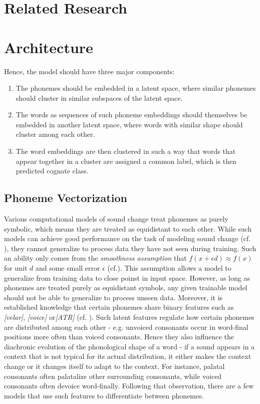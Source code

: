 \documentclass[6pt]{article}
\begin{document}
\section{Related Research}
\section{Architecture}
Hence, the model should have three major components:
\begin{enumerate}
\item The phonemes should be embedded in a latent space, where similar phonemes should cluster in similar subspaces of the latent space.
\item The words as sequences of such phoneme embeddings should themselves be embedded in another latent space, where words with similar shape should cluster among each other. 
\item The word embeddings are then clustered in such a way that words that appear together in a cluster are assigned a common label, which is then predicted cognate class.
\end{enumerate}

\subsection{Phoneme Vectorization}
\label{Phoneme Vectorization}
Various computational models of sound change treat phonemes as purely symbolic, which means they are treated as equidistant to each other. While such models can achieve good performance on the task of modeling sound change (cf. \cite{bouchard2007probabilistic,bouchard2013automated}), they cannot generalize to process data they have not seen during training. Such an ability only comes from the \textit{smoothness assumption} that $f(x + \epsilon d) \approx f(x)$ for unit $d$ and some small error $\epsilon$ (cf.\cite[p. 555]{Goodfellow-et-al-2016-Book}). This assumption allows a model to generalize from training data to close poinst in input space.  However, as long as phonemes are treated purely as equidistant symbols, any given trainable model should not be able to generalize to process unseen data.
Moreover, it is established knowledge that certain phonemes share binary features such as \textit{[velar]}, \textit{[voice]}  or\textit{[ATR]} (cf. \cite{chomsky1968sound}). Such latent features regulate how certain phonemes are distributed among each other - e.g. unvoiced consonants occur in word-final positions more often than voiced consonants. Hence they also influence the diachronic evolution of the phonological shape of a word - if a sound appears in a context that is not typical for its actual distribution, it either makes the context change or it changes itself to adapt to the context. For instance, palatal consonants often palatalize other surrounding consonants, while voiced consonants often devoice word-finally.
Following that observation, there are a few models that use such features to differentiate between phonemes. 
\end{document}
